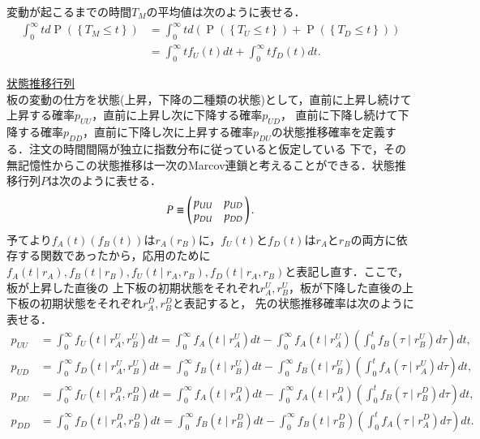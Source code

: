 \documentclass[a4j,papersize,disablejfam,slide,14pt]{jsarticle}
\def\prob#1{\operatorname{P} \left(\left\{ #1 \right\}\right)} %
\begin{document}
    変動が起こるまでの時間$T_M$の平均値は次のように表せる．
    \begin{align}
    	\int_{0}^{\infty} t d\prob{T_M \leq t} &= \int_{0}^{\infty} t d(\prob{T_U \leq t} + \prob{T_D \leq t}) \\
        &= \int_{0}^{\infty} t f_U(t) dt + \int_{0}^{\infty} t f_D(t) dt.
    \end{align}
    
\underline{\large 状態推移行列}\\
    板の変動の仕方を状態(上昇，下降の二種類の状態)として，直前に上昇し続けて上昇する確率$p_{UU}$，直前に上昇し次に下降する確率$p_{UD}$，
    直前に下降し続けて下降する確率$p_{DD}$，直前に下降し次に上昇する確率$p_{DU}$の状態推移確率を定義する．注文の時間間隔が独立に指数分布に従っていると仮定している
    下で，その無記憶性からこの状態推移は一次の{\rm Marcov}連鎖と考えることができる．状態推移行列$P$は次のように表せる．
    \begin{align}
    	P \equiv \left(
    	\begin{array}{@{\,}cc@{\,}}
    		p_{UU} & p_{UD} \\
            p_{DU} & p_{DD}
    	\end{array}
    	\right). \\ \label{eq:transient_probability_matrix}
    \end{align}
    予てより$f_A(t)(f_B(t))$は$r_A(r_B)$に，$f_U(t)$と$f_D(t)$は$r_A$と$r_B$の両方に依存する関数であったから，応用のために
    $f_A(t \mid r_A), f_B(t \mid r_B), f_U(t \mid r_A, r_B), f_D(t \mid r_A, r_B)$と表記し直す．ここで，板が上昇した直後の
    上下板の初期状態をそれぞれ$r_A^U, r_B^U$，板が下降した直後の上下板の初期状態をそれぞれ$r_A^D, r_B^D$と表記すると，
    先の状態推移確率は次のように表せる．
    \begin{align}
    	p_{UU} &= \int_{0}^{\infty} f_U(t \mid r_A^U, r_B^U) dt = \int_{0}^{\infty} f_A(t \mid r_A^U)dt - \int_{0}^{\infty} f_A(t \mid r_A^U) \left( \int_{0}^{t} f_B(\tau \mid r_B^U)d\tau \right) dt, \\
        p_{UD} &= \int_{0}^{\infty} f_D(t \mid r_A^U, r_B^U) dt = \int_{0}^{\infty} f_B(t \mid r_B^U)dt - \int_{0}^{\infty} f_B(t \mid r_B^U) \left( \int_{0}^{t} f_A(\tau \mid r_A^U)d\tau \right) dt, \\
        p_{DU} &= \int_{0}^{\infty} f_U(t \mid r_A^D, r_B^D) dt = \int_{0}^{\infty} f_A(t \mid r_A^D)dt - \int_{0}^{\infty} f_A(t \mid r_A^D) \left( \int_{0}^{t} f_B(\tau \mid r_B^D)d\tau \right) dt, \\
        p_{DD} &= \int_{0}^{\infty} f_D(t \mid r_A^D, r_B^D) dt = \int_{0}^{\infty} f_B(t \mid r_B^D)dt - \int_{0}^{\infty} f_B(t \mid r_B^D) \left( \int_{0}^{t} f_A(\tau \mid r_A^D)d\tau \right) dt.
    \end{align}
\end{document}
